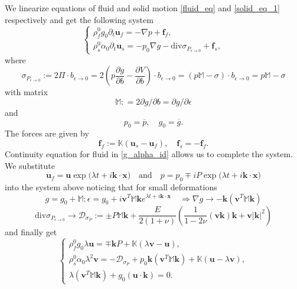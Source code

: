 \documentclass[12pt]{article}
\numberwithin{theorem}{section}
\begin{document}
We linearize equations of fluid and solid motion \eqref{fluid_eq} and \eqref{solid_eq_1} respectively and get the following system
\begin{equation}\left\{
\begin{array}{l}\rho_f^0g_0\partial_t \mathbf{u}_f =-\nabla p+\mathbf{f}_f
,\\ \rho_s^0\alpha_0\partial_t \mathbf{u}_s =-p_0\nabla g - \mathrm{div}\sigma_{P_{\epsilon\rightarrow0}} + \mathbf{f}_s, \end{array}\right.\end{equation} where
\begin{equation}\sigma_{P_{\epsilon\rightarrow0}} := 2\Pi\cdot b_{\epsilon\rightarrow0} = 2\left(p \frac{\partial g}{\partial b} -  \frac{\partial V}{\partial b}\right)\cdot b_{\epsilon\rightarrow0} = (p\mathbb{M} - \sigma)\cdot b_{\epsilon\rightarrow0} = p\mathbb{M} - \sigma\end{equation} 
with matrix \begin{equation}\mathbb{M} : = 2 \partial g/\partial b = \partial g/\partial \epsilon\end{equation} and
\begin{equation}p_0 = \overline{p}, \quad g_0 = \overline{g}.\end{equation}
The forces are given by 
\begin{equation}\mathbf{f}_f := \mathbb{K}(\mathbf{u}_s-\mathbf{u}_f), \quad \mathbf{f}_s = -\mathbf{f}_f.\end{equation}
Continuity equation for fluid in  \eqref{g_alpha_id} allows us to complete the system. We substitute \begin{equation}\mathbf{u}_f = \mathbf{u} \exp({\lambda t + i\mathbf{k}\cdot \mathbf{x})}\quad\mbox{and}
\quad p = p_0 \mp iP\exp({\lambda t + i\mathbf{k}\cdot \mathbf{x})}\end{equation} into the system above noticing that for small deformations
\begin{equation}g=g_0 + \mathbb{M}:\epsilon=g_0 + i\mathbf{v}^T\mathbb{M}\mathbf{k}e^{\lambda t + i\mathbf{k\cdot x}}\quad \Rightarrow \nabla g \rightarrow -\mathbf{k}(\mathbf{v}^T\mathbb{M}\mathbf{k})\end{equation}
\begin{equation}\mathrm{div}\sigma_{P_{\epsilon\rightarrow0}}\rightarrow \mathcal{D}_{\sigma_P}:=\pm P\mathbb{M}\mathbf{k}+\frac{E}{2(1+\nu)}\left(\frac1{1-2\nu}\mathbf{(vk)k+v|k|}^2\right)\end{equation}
and finally get
\begin{equation}\left\{
\begin{array}{l}\rho_f^0g_0\lambda \mathbf{u}=\mp \mathbf{k}P+\mathbb{K}(\lambda\mathbf{v}-\mathbf{u}),\\ \rho_s^0\alpha_0\lambda^2 \mathbf{v}=-\mathcal{D}_{\sigma_P}+p_0\mathbf{k}(\mathbf{v}^T\mathbb{M}\mathbf{k})+\mathbb{K}(\mathbf{u}-\lambda\mathbf{v}) ,\\
\lambda(\mathbf{v}^T \mathbb{M} \mathbf{k}) + g_0(\mathbf{u}\cdot\mathbf{k})=0.\end{array}\right.\end{equation}
\end{document}
